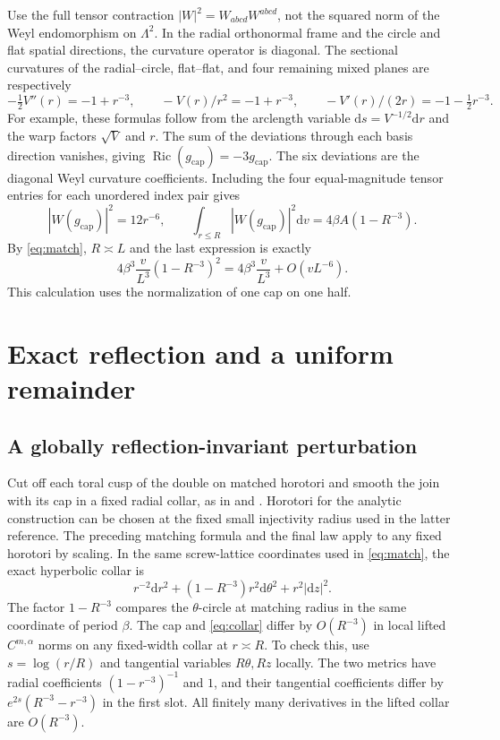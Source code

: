 \documentclass[11pt]{article}
\theoremstyle{remark}
\newcommand{\Ric}{\operatorname{Ric}}
\newcommand{\dd}{\mathrm d}
\begin{document}
Use the full tensor contraction \(|W|^2=W_{abcd}W^{abcd}\), not the squared norm of the Weyl endomorphism on \(\Lambda^2\). In the radial orthonormal frame and the circle and flat spatial directions, the curvature operator is diagonal. The sectional curvatures of the radial--circle, flat--flat, and four remaining mixed planes are respectively
\[
 -\tfrac12 V''(r)=-1+r^{-3},\qquad
 -V(r)/r^2=-1+r^{-3},\qquad
 -V'(r)/(2r)=-1-\tfrac12 r^{-3}.
\]
For example, these formulas follow from the arclength variable \(\dd s=V^{-1/2}\dd r\) and the warp factors \(\sqrt V\) and \(r\). The sum of the deviations through each basis direction vanishes, giving \(\Ric(g_{\mathrm{cap}})=-3g_{\mathrm{cap}}\). The six deviations are the diagonal Weyl curvature coefficients. Including the four equal-magnitude tensor entries for each unordered index pair gives
\begin{equation}\label{eq:weylmodel}
 |W(g_{\mathrm{cap}})|^2=12r^{-6},\qquad
 \int_{r\le R}|W(g_{\mathrm{cap}})|^2\dd v
       =4\beta A(1-R^{-3}).
\end{equation}
By \eqref{eq:match}, \(R\asymp L\) and the last expression is exactly
\[
 4\beta^3\frac{v}{L^3}(1-R^{-3})^2
       =4\beta^3\frac{v}{L^3}+O(vL^{-6}).
\]
This calculation uses the normalization of one cap on one half.

\section{Exact reflection and a uniform remainder}\label{sec:estimates}

\subsection{A globally reflection-invariant perturbation}

Cut off each toral cusp of the double on matched horotori and smooth the join with its cap in a fixed radial collar, as in \cite[(3.4), (3.8)--(3.11)]{anderson} and \cite[\S3]{bamler}. Horotori for the analytic construction can be chosen at the fixed small injectivity radius used in the latter reference. The preceding matching formula and the final law apply to any fixed horotori by scaling. In the same screw-lattice coordinates used in \eqref{eq:match}, the exact hyperbolic collar is
\begin{equation}\label{eq:collar}
 r^{-2}\dd r^2 +(1-R^{-3})r^2\dd\theta^2+r^2|\dd z|^2 .
\end{equation}
The factor \(1-R^{-3}\) compares the \(\theta\)-circle at matching radius in the same coordinate of period \(\beta\). The cap and \eqref{eq:collar} differ by \(O(R^{-3})\) in local lifted \(C^{m,\alpha}\) norms on any fixed-width collar at \(r\asymp R\). To check this, use \(s=\log(r/R)\) and tangential variables \(R\theta,Rz\) locally. The two metrics have radial coefficients \((1-r^{-3})^{-1}\) and \(1\), and their tangential coefficients differ by \(e^{2s}(R^{-3}-r^{-3})\) in the first slot. All finitely many derivatives in the lifted collar are \(O(R^{-3})\).
\end{document}
